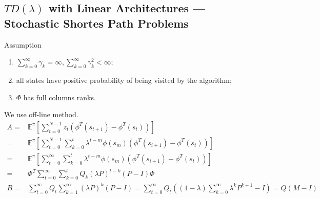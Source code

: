 \subsection{$ TD(\lambda) $ with Linear Architectures --- Stochastic Shortes Path Problems}%

Assumption
\begin{enumerate}
    \item $ \sum^{\infty}_{k=0} \gamma_k=\infty, \sum^{\infty}_{k=0} \gamma^2_k < \infty $;
    \item all states have positive probability of being visited by the algorithm;
    \item $ \Phi $ has full columns ranks.
\end{enumerate}

We use {off-line} method.
\begin{align*}
    A =& \mathbb{E}^{\pi} \left[ \sum^{N-1}_{t=0} z_t(\phi^T(s_{t+1}) - \phi^T(s_t)) \right]\\
    =& \mathbb{E}^{\pi} \left[ \sum^{N-1}_{t=0} \sum^{t}_{k=0} \lambda^{t-m} \phi(s_m) (\phi^T(s_{i+1}) - \phi^T(s_t))  \right]\\
    =& \mathbb{E}^{\pi}\left[ \sum^{\infty}_{t=0} \sum^{t}_{k=0} \lambda^{t-m} \phi(s_m) (\phi^T(s_{i+1}) - \phi^T(s_t))  \right]\\
    =& \Phi^{T} \sum^{\infty}_{t=0} \sum^{t}_{k = 0} Q_{k} {(\lambda P)}^{t-k} (P - I) \Phi \\
    B =& \sum^{\infty}_{t=0} Q_t \sum^{\infty}_{k=1} {(\lambda P)}^{k}(P - I) 
    = \sum^{\infty}_{t=0} Q_t \left( (1 - \lambda) \sum^{\infty}_{k=0} \lambda^k P^{k+1} - I \right) = Q(M - I)
\end{align*}


